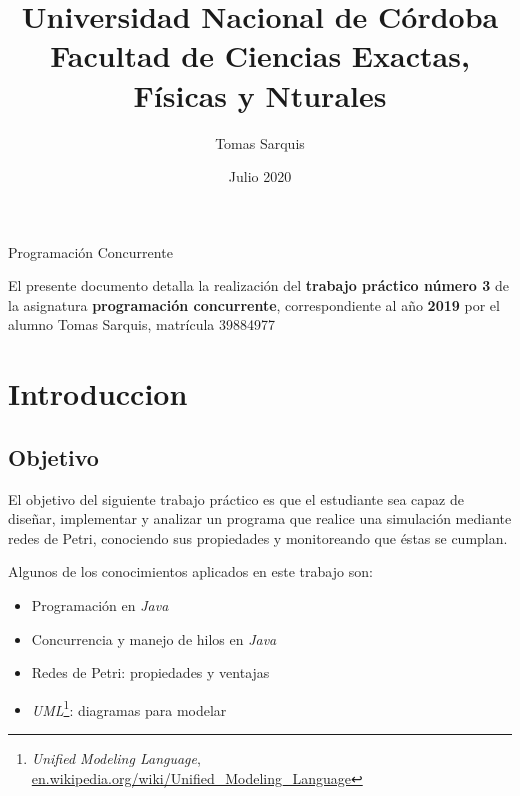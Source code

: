 \documentclass{article}
\title{Universidad Nacional de Córdoba\\Facultad de Ciencias Exactas, Físicas y Nturales}
\author{Tomas Sarquis}
\date{Julio 2020}
\newcommand{\fnuml}{\emph{Unified Modeling Language}, \url{en.wikipedia.org/wiki/Unified_Modeling_Language}}
\begin{document}
    \begin{titlingpage}
        \maketitle
        \null \null \null \null
        \begin{center}
            {\huge Programación Concurrente}
        \end{center}
        \vspace*{\fill}
        \justify
        El presente documento detalla la realización del \textbf{trabajo práctico número 3} 
        de la asignatura \textbf{programación concurrente}, correspondiente al año \textbf{2019}
        por el alumno Tomas Sarquis, matrícula 39884977
        \vspace*{\fill}
    \end{titlingpage}
    \tableofcontents 
    \newpage
    \section{Introduccion}
    \subsection{Objetivo}
    El objetivo del siguiente trabajo práctico es que el estudiante sea capaz de diseñar,
    implementar y analizar un programa que realice una simulación mediante redes de Petri,
    conociendo sus propiedades y monitoreando que éstas se cumplan. \par
    Algunos de los conocimientos aplicados en este trabajo son:
    \begin{itemize}
        \item Programación en \emph{Java}
        \item Concurrencia y manejo de hilos en \emph{Java}
        \item Redes de Petri: propiedades y ventajas
        \item \emph{UML}\footnote{\fnuml}: diagramas para modelar
    \end{itemize}
\end{document}
